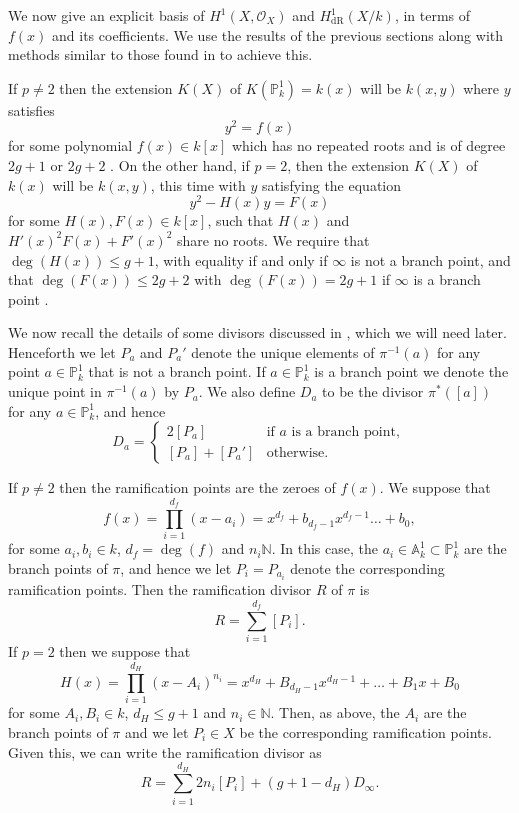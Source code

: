 \documentclass[draft, 11pt]{article} %
\theoremstyle{plain}
\theoremstyle{remark}
\newcommand{\hone}{H^1(X,\mathcal{O}_X)}
\newcommand{\derhamhone}{H_{\text {dR}}^1(X/k)}
\begin{document}
We now give an explicit basis of $\hone$ and $\derhamhone$, in terms of $f(x)$ and its coefficients.
We use the results of the previous sections along with methods similar to those found in \cite{canonicalrepresentation} to achieve this.

If $p \neq 2$ then the extension $K(X)$ of $K(\mathbb P_k^1) = k(x)$ will be $k(x,y)$ where $y$ satisfies
\begin{equation}\label{definingequationpnot2}
y^2 = f(x)
\end{equation}
for some polynomial $f(x) \in k[x]$ which has no repeated roots and is of degree $2g+1$ or $2g+2$ \cite[Prop 7.4.24]{liu}.
On the other hand, if $p=2$, then the extension $K(X)$ of $k(x)$ will be $k(x,y)$, this time with $y$ satisfying the equation
\begin{equation}\label{definep=2}
y^2 - H(x)y = F(x)
\end{equation}
for some $H(x),F(x) \in k[x]$, such that $H(x)$ and $H'(x)^2F(x) + F'(x)^2$ share no roots.
We require that $\deg(H(x)) \leq g+1$, with equality if and only if $\infty$ is not a branch point, and that $\deg(F(x)) \leq 2g+2$ with $\deg(F(x)) = 2g+1$ if $\infty$ is a branch point  \cite[Prop 7.4.24]{liu}.

We now recall the details of some divisors discussed in \cite{faithfulaction}, which we will need later.
Henceforth we let $P_a$ and $P_a'$ denote the unique elements of $\pi^{-1}(a)$ for any point $a \in \mathbb P_k^1$ that is not a branch point.
If $a \in \mathbb P_k^1$ is a branch point we denote the unique point in $\pi^{-1}(a)$ by $P_a$.
We also define $D_a$ to be the divisor $\pi^*\left([a]\right)$ for any $a \in \mathbb P_k^1$, and hence
\begin{equation*}
D_a= 
\begin{cases}
 2[P_a] & \text{if $a$ is a branch point}, \\
 [P_a] + [P_a'] & \text{otherwise.}
\end{cases}
\end{equation*}

If $p \neq 2$ then the ramification points are the zeroes of $f(x)$.
We suppose that 
\[
f(x) = \prod_{i=1}^{d_f} (x-a_i) = x^{d_f} + b_{d_f - 1}x^{d_f-1} \ldots + b_0,
\]
for some $a_i, b_i \in k$, $d_f = \deg(f) $ and $n_i \mathbb N$.
In this case, the $a_i \in \mathbb A_k^1 \subset \mathbb P_k^1$ are the branch points of $\pi$, and hence we let $P_i = P_{a_i}$ denote the corresponding ramification points.
Then the ramification divisor $R$ of $\pi$ is
\[
R = \sum_{i=1}^{d_f} [P_i].
\]
If $p=2$ then we suppose that
\begin{equation*}
H(x) = \prod_{i=1}^{d_H} (x-A_i)^{n_i} = x^{d_H} + B_{{d_H}-1}x^{{d_H}-1} + \ldots + B_1x + B_0
\end{equation*}
for some $A_i, B_i \in  k$, ${d_H} \leq g+1$ and $n_i \in \mathbb N$.
Then, as above, the $A_i$ are the branch points of $\pi$ and we let $P_i \in X$ be the corresponding ramification points.
Given this, we can write the ramification divisor as
\[
R = \sum_{i=1}^{d_H} 2n_i[P_i] + (g+1-{d_H})D_\infty.
\]
\end{document}
